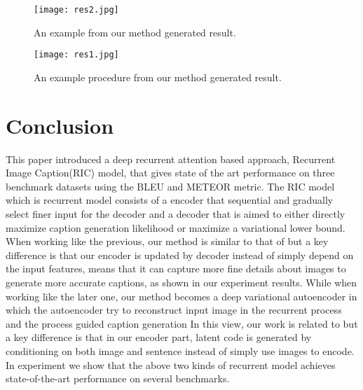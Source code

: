 \documentclass[10pt,twocolumn,letterpaper]{article}
\begin{document}
	\begin{figure*}[t]
		\begin{center}
			\texttt{[image: res2.jpg]}
		\end{center}
		\caption{An example from our method generated result.}
		\label{fig.res2}
	\end{figure*}
	
	
	\begin{figure*}[t]
		\begin{center}
			\texttt{[image: res1.jpg]}
		\end{center}
		\caption{An example procedure from our method generated result.}
		\label{fig.res1}
	\end{figure*}
	
	\section{Conclusion}
	This paper introduced a deep recurrent attention based approach, Recurrent Image Caption(RIC) model, that gives state of the art performance on three benchmark datasets using the BLEU and METEOR metric.  The RIC model which is recurrent model consists of a encoder that sequential and gradually select finer input for the decoder and a decoder that is aimed to either directly maximize caption generation likelihood or maximize a variational lower bound.  When working like the previous,  our method is similar to that of \cite{xu2015show} but a key difference is that our encoder is updated by decoder instead of simply depend on the input features, means that it can capture more fine details about images to generate more accurate captions, as shown in our experiment results. While when working like the later one, our method becomes a deep variational autoencoder in which the autoencoder try to reconstruct input image in the recurrent process and the process guided caption generation In this view, our work is related to \cite{pu2016variational} but a key difference is that in our encoder part, latent code is generated by conditioning on both image and sentence instead of simply use images to encode.  In experiment we show that the above two kinds of  recurrent model achieves state-of-the-art performance on several benchmarks.
	
	
	
	
	
	
	
	{\small
		
		
	}
	
\end{document}
